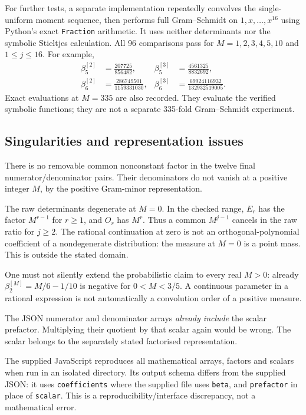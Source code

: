 \documentclass[11pt,a4paper]{article}
\begin{document}
For further tests, a separate implementation repeatedly convolves the single-uniform moment sequence, then performs full Gram--Schmidt on $1,x,\ldots,x^{16}$ using Python's exact \texttt{Fraction} arithmetic. It uses neither determinants nor the symbolic Stieltjes calculation. All 96 comparisons pass for $M=1,2,3,4,5,10$ and $1\leq j\leq16$. For example,
\[
\begin{aligned}
\beta_5^{[2]}&=\frac{207725}{856482},
&\beta_5^{[3]}&=\frac{4561325}{8832692},\\
\beta_6^{[2]}&=\frac{286749501}{1159331030},
&\beta_6^{[3]}&=\frac{69924116932}{132932519005}.
\end{aligned}
\]
Exact evaluations at $M=335$ are also recorded. They evaluate the verified symbolic functions; they are not a separate 335-fold Gram--Schmidt experiment.

\subsection*{Singularities and representation issues}
There is no removable common nonconstant factor in the twelve final numerator/denominator pairs. Their denominators do not vanish at a positive integer $M$, by the positive Gram-minor representation.

The raw determinants degenerate at $M=0$. In the checked range, $E_r$ has the factor $M^{r-1}$ for $r\geq1$, and $O_r$ has $M^r$. Thus a common $M^{j-1}$ cancels in the raw ratio for $j\geq2$. The rational continuation at zero is not an orthogonal-polynomial coefficient of a nondegenerate distribution: the measure at $M=0$ is a point mass. This is outside the stated domain.

One must not silently extend the probabilistic claim to every real $M>0$: already $\beta_2^{[M]}=M/6-1/10$ is negative for $0<M<3/5$. A continuous parameter in a rational expression is not automatically a convolution order of a positive measure.

The JSON numerator and denominator arrays \emph{already include} the scalar prefactor. Multiplying their quotient by that scalar again would be wrong. The scalar belongs to the separately stated factorised representation.

The supplied JavaScript reproduces all mathematical arrays, factors and scalars when run in an isolated directory. Its output schema differs from the supplied JSON: it uses \texttt{coefficients} where the supplied file uses \texttt{beta}, and \texttt{prefactor} in place of \texttt{scalar}. This is a reproducibility/interface discrepancy, not a mathematical error.
\end{document}

